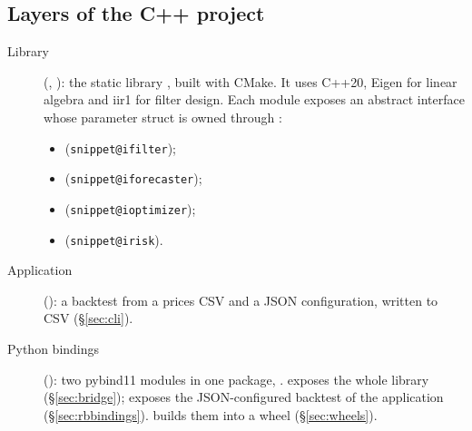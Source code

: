 \documentclass[11pt,a4paper]{article}
\makeatletter
\newcommand{\snippetsource}[1]{\csname snippet@#1\endcsname}
\newcommand{\coderef}[1]{{\footnotesize\texttt{\snippetsource{#1}}}}
\makeatother
\begin{document}
\subsection{Layers of the C++ project}
\begin{description}
  \item[Library] (, ): the static library ,
        built with CMake. It uses C++20, Eigen for linear algebra and iir1 for filter
        design. Each module exposes an abstract interface whose parameter struct is owned
        through :
        \begin{itemize}
          \item {} (\coderef{ifilter});
          \item {} (\coderef{iforecaster});
          \item {} (\coderef{ioptimizer});
          \item {} (\coderef{irisk}).
        \end{itemize}
  \item[Application]  (): a backtest from a
        prices CSV and a JSON configuration, written to CSV (\S\ref{sec:cli}).
  \item[Python bindings] (): two pybind11 modules in one package,
        .  exposes the whole library (\S\ref{sec:bridge});
         exposes the JSON-configured backtest of the application
        (\S\ref{sec:rbbindings}).  builds them into a wheel (\S\ref{sec:wheels}).
\end{description}
\end{document}
